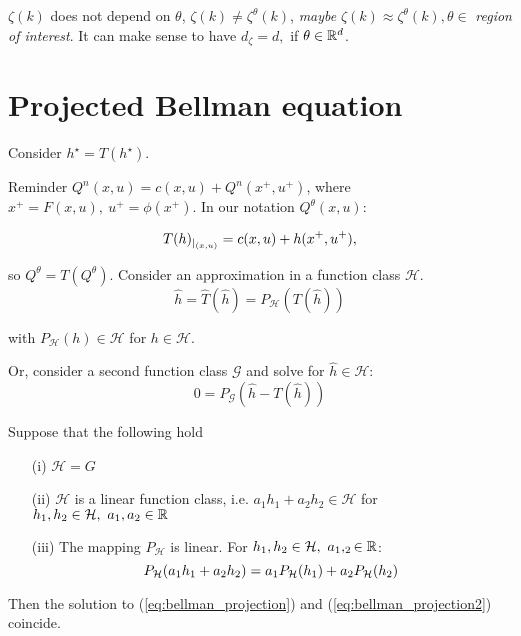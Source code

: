 \(\zeta(k)\) does not depend on \(\theta\), \(\zeta(k)\neq \zeta^\theta(k)\),
\textit{maybe} \(\zeta(k)\approx \zeta^\theta(k),\theta\in\) \textit{region of interest}.
It can make sense to have \(d_\zeta=d,\) if \(\theta\in \mathbb{R}^d\).

\section{Projected Bellman equation}

Consider \(h^\star=T(h^\star)\). 

Reminder \(Q^n(x,u)=c(x,u)+Q^n(x^+,u^+)\), where \(x^+=F(x,u),\ u^+=\phi(x^+)\). In our notation \(Q^\theta(x,u)\):

\begin{align*}
    T(h)_{|_{(x,u)}}=c(x,u)+h(x^+,u^+),
\end{align*}

so \(Q^\theta=T\left(Q^\theta\right)\). Consider an approximation in a function class \(\mathcal{H}\).
\begin{equation}\label{eq:bellman_projection}
    \hat{h}=\hat{T}(\hat{h})=P_{\mathcal{H}}(T(\hat{h}))
\end{equation}

with \(P_\mathcal{H}(h)\in\mathcal{H}\) for \(h\in \mathcal{H}\).

Or, consider a second function class \(\mathcal{G}\) and solve 
for \(\hat{h}\in \mathcal{H}:\)
\begin{equation}\label{eq:bellman_projection2}
    0=P_\mathcal{G}(\hat{h}-T(\hat{h}))
\end{equation}

\begin{proposition}\label{prop:48}
    Suppose that the following hold
    \begin{enumerate}
        \item[(i)] \(\mathcal{H}=G\)
        \item[(ii)] \(\mathcal{H}\) is a linear function class, i.e. \(a_1h_1+a_2h_2\in\mathcal{H}\) for \(h_1,h_2\in\mathcal{H},\ a_1,a_2\in\R\) 
        \item[(iii)] The mapping \(P_\mathcal{H}\) is linear. For  \(h_1,h_2\in \mathcal{H},\ a_1,_2\in \mathbb{R}\): \[P_{\mathcal{H}}(a_1h_1+a_2h_2)=a_1P_{\mathcal{H}}(h_1)+a_2P_{\mathcal{H}}(h_2)\]
    \end{enumerate}
    Then the solution to (\ref{eq:bellman_projection}) and (\ref{eq:bellman_projection2}) coincide.



\end{proposition}





